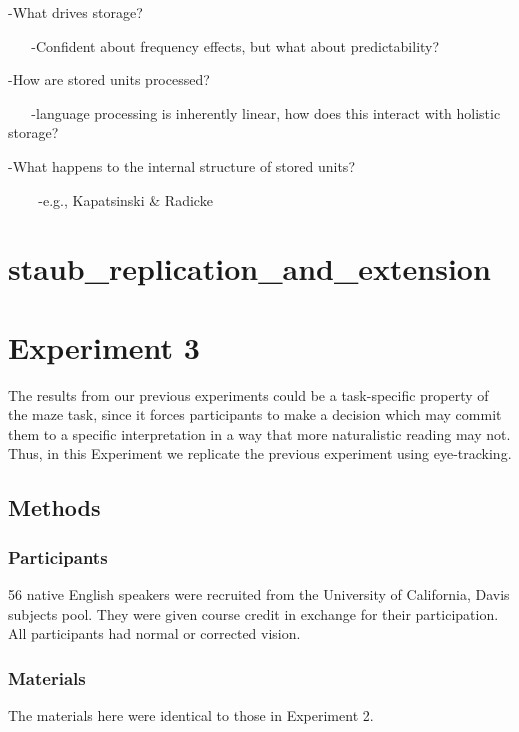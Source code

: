 \documentclass[
  letterpaper,
  DIV=11,
  numbers=noendperiod,
  nottoc]{scrreprt}
\begin{document}
-What drives storage?

~ ~ -Confident about frequency effects, but what about predictability?

-How are stored units processed?

~ ~ -language processing is inherently linear, how does this interact
with holistic storage?

-What happens to the internal structure of stored units?

~ ~ ~-e.g., Kapatsinski \& Radicke


\chapter{staub\_replication\_and\_extension}\label{staub_replication_and_extension}


\chapter{Experiment 3}\label{experiment-3}

The results from our previous experiments could be a task-specific
property of the maze task, since it forces participants to make a
decision which may commit them to a specific interpretation in a way
that more naturalistic reading may not. Thus, in this Experiment we
replicate the previous experiment using eye-tracking.

\section{Methods}\label{methods}

\subsection{Participants}\label{participants}

56 native English speakers were recruited from the University of
California, Davis subjects pool. They were given course credit in
exchange for their participation. All participants had normal or
corrected vision.

\subsection{Materials}\label{materials}

The materials here were identical to those in Experiment 2.
\end{document}
